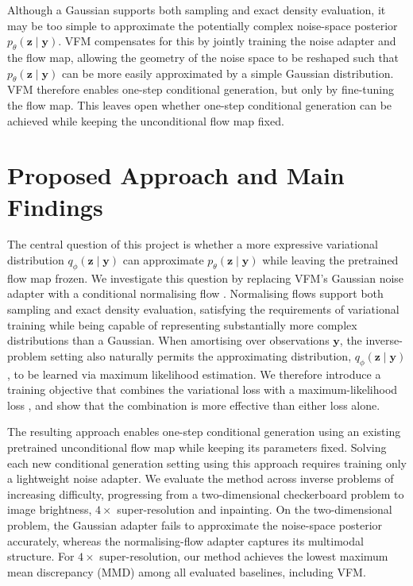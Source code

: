 \documentclass[12pt,a4paper]{report}
\begin{document}
Although a Gaussian supports both sampling and exact density evaluation, it may be too simple to approximate the potentially complex noise-space posterior \(p_{\theta}(\mathbf{z}\mid\mathbf{y})\). VFM compensates for this by jointly training the noise adapter and the flow map, allowing the geometry of the noise space to be reshaped such that \(p_{\theta}(\mathbf{z}\mid\mathbf{y})\) can be more easily approximated by a simple Gaussian distribution.  
VFM therefore enables one-step conditional generation, but only by fine-tuning the flow map. This leaves open whether one-step conditional generation can be achieved while keeping the unconditional flow map fixed. 

\section{Proposed Approach and Main Findings}
\label{sec:proposed_approach_and_main_findings}
The central question of this project is whether a more expressive variational distribution $q_{\phi}(\mathbf{z}\mid\mathbf{y})$ can approximate \(p_{\theta}(\mathbf{z}\mid\mathbf{y})\) while leaving the pretrained flow map frozen. We investigate this question by replacing VFM's Gaussian noise adapter with a conditional normalising flow \parencite{VI_NF,NF_survey}. Normalising flows support both sampling and exact density evaluation, satisfying the requirements of variational training while being capable of representing substantially more complex distributions than a Gaussian. When amortising over observations $\mathbf{y}$, the inverse-problem setting also naturally permits the approximating distribution, $q_{\phi}(\mathbf{z}\mid\mathbf{y})$, to be learned via maximum likelihood estimation. We therefore introduce a training objective that combines the variational loss with a maximum-likelihood loss \parencite{BG}, and show that the combination is more effective than either loss alone.

The resulting approach enables one-step conditional generation using an existing pretrained unconditional flow map while keeping its parameters fixed. Solving each new conditional generation setting using this approach requires training only a lightweight noise adapter. We evaluate the method across inverse problems of increasing difficulty, progressing from a two-dimensional checkerboard problem to image brightness, \(4\times\) super-resolution and inpainting. On the two-dimensional problem, the Gaussian adapter fails to approximate the noise-space posterior accurately, whereas the normalising-flow adapter captures its multimodal structure. For \(4\times\) super-resolution, our method achieves the lowest maximum mean discrepancy (MMD) among all evaluated baselines, including VFM. 
\end{document}
